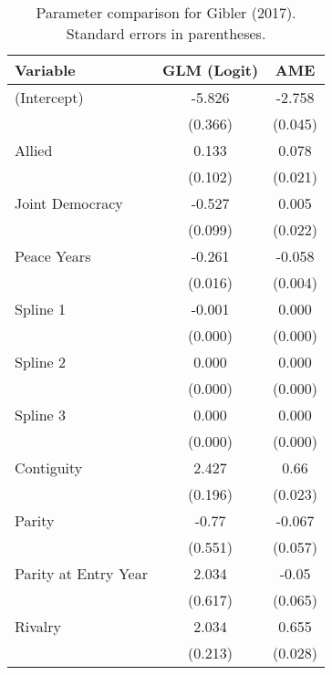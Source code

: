 \begin{table}[ht]
\centering
\begingroup\normalsize
\begin{tabular}{lcc}
 Variable & GLM (Logit) & AME \\ 
  \hline
\hline
(Intercept) & -5.826 & -2.758 \\ 
   & (0.366) & (0.045) \\ 
  Allied & 0.133 & 0.078 \\ 
   & (0.102) & (0.021) \\ 
  Joint Democracy & -0.527 & 0.005 \\ 
   & (0.099) & (0.022) \\ 
  Peace Years & -0.261 & -0.058 \\ 
   & (0.016) & (0.004) \\ 
  Spline 1 & -0.001 & 0.000 \\ 
   & (0.000) & (0.000) \\ 
  Spline 2 & 0.000 & 0.000 \\ 
   & (0.000) & (0.000) \\ 
  Spline 3 & 0.000 & 0.000 \\ 
   & (0.000) & (0.000) \\ 
  Contiguity & 2.427 & 0.66 \\ 
   & (0.196) & (0.023) \\ 
  Parity & -0.77 & -0.067 \\ 
   & (0.551) & (0.057) \\ 
  Parity at Entry Year & 2.034 & -0.05 \\ 
   & (0.617) & (0.065) \\ 
  Rivalry & 2.034 & 0.655 \\ 
   & (0.213) & (0.028) \\ 
   \hline
\hline
\end{tabular}
\endgroup
\caption{Parameter comparison for Gibler (2017). Standard errors in parentheses.} 
\label{tab:gibler_appendix_tableB3_orig_coef}
\end{table}

